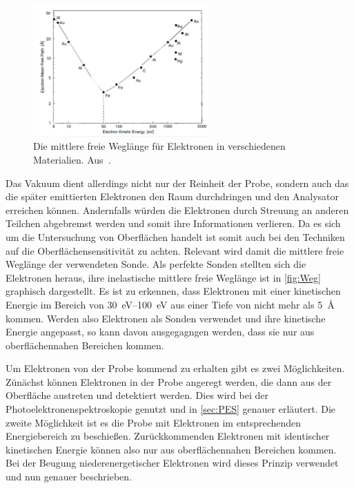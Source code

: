         \begin{figure}
            \centering
            \includegraphics[width=0.6\textwidth]{Weg}
            \caption{Die mittlere freie Weglänge für Elektronen in verschiedenen Materialien. Aus~\cite{Hüfner}.}
            \label{fig:Weg}
        \end{figure}
        Das Vakuum dient allerdings nicht nur der Reinheit der Probe, sondern auch das die später emittierten Elektronen den Raum durchdringen und den Analysator erreichen können.
        Andernfalls würden die Elektronen durch Streuung an anderen Teilchen abgebremst werden und somit ihre Informationen verlieren.
        Da es sich um die Untersuchung von Oberflächen handelt ist somit auch bei den Techniken auf die Oberflächensensitivität zu achten.
        Relevant wird damit die mittlere freie Weglänge der verwendeten Sonde.
        Als perfekte Sonden stellten sich die Elektronen heraus, ihre inelastische mittlere freie Weglänge ist in \autoref{fig:Weg} graphisch dargestellt.
        Es ist zu erkennen, dass Elektronen mit einer kinetischen Energie im Bereich von \SIrange{30}{100}{\electronvolt} aus einer Tiefe von nicht mehr als \SI{5}{\angstrom} kommen.
        Werden also Elektronen als Sonden verwendet und ihre kinetische Energie angepasst, so kann davon ausgegagngen werden, dass sie nur aus oberflächennahen Bereichen kommen.

        Um Elektronen von der Probe kommend zu erhalten gibt es zwei Möglichkeiten.
        Zünächst können Elektronen in der Probe angeregt werden, die dann aus der Oberfläche austreten und detektiert werden.
        Dies wird bei der Photoelektronenspektroskopie genutzt und in \autoref{sec:PES} genauer erläutert.
        Die zweite Möglichkeit ist es die Probe mit Elektronen im entsprechenden Energiebereich zu beschießen.
        Zurückkommenden Elektronen mit identischer kinetischen Energie können also nur aus oberflächennahen Bereichen kommen.
        Bei der Beugung niederenergetischer Elektronen wird dieses Prinzip verwendet und nun genauer beschrieben.

